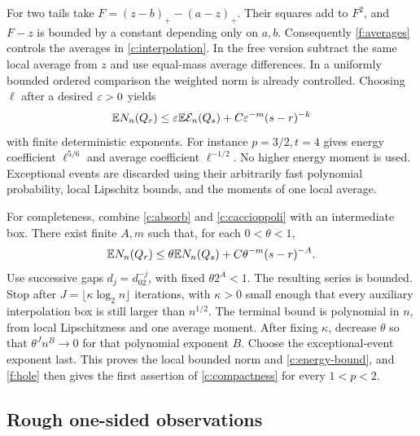 For two tails take $F=(z-b)_+-(a-z)_+$. Their squares add to $F^2$,
and $F-z$ is bounded by a constant depending only on $a,b$.
Consequently \ref{f:averages} controls the averages in
\eqref{c:interpolation}. In the free version subtract the same local
average from $z$ and use equal-mass average differences. In a uniformly
bounded ordered comparison the weighted norm is already controlled.
Choosing $\ell$ after a desired $\varepsilon>0$ yields
\begin{equation}\label{c:absorb}
 \mathbb E N_n(Q_r)\le\varepsilon\mathbb E\mathcal E_n(Q_s)
                 +C\varepsilon^{-m}(s-r)^{-k}
\end{equation}
with finite deterministic exponents. For instance $p=3/2,t=4$ gives
energy coefficient $\ell^{5/6}$ and average coefficient
$\ell^{-1/2}$. No higher energy moment is used. Exceptional events
are discarded using their arbitrarily fast polynomial probability,
local Lipschitz bounds, and the moments of one local average.

For completeness, combine \eqref{c:absorb} and
\eqref{c:caccioppoli} with an intermediate box. There exist finite
$A,m$ such that, for each $0<\theta<1$,
\[
 \mathbb E N_n(Q_r)\le\theta\mathbb E N_n(Q_s)
                  +C\theta^{-m}(s-r)^{-A}.
\]
Use successive gaps $d_j=d_02^{-j}$, with fixed
$\theta2^A<1$. The resulting series is bounded. Stop after
$J=\lfloor\kappa\log_2n\rfloor$ iterations, with $\kappa>0$ small
enough that every auxiliary interpolation box is still larger than
$n^{1/2}$. The terminal bound is polynomial in $n$, from local
Lipschitzness and one average moment. After fixing $\kappa$, decrease
$\theta$ so that $\theta^Jn^B\to0$ for that polynomial exponent $B$.
Choose the exceptional-event exponent last. This proves the local
bounded norm and \eqref{c:energy-bound}, and \ref{f:hole} then gives
the first assertion of \eqref{c:compactness} for every $1<p<2$.

\subsection{Rough one-sided observations}

